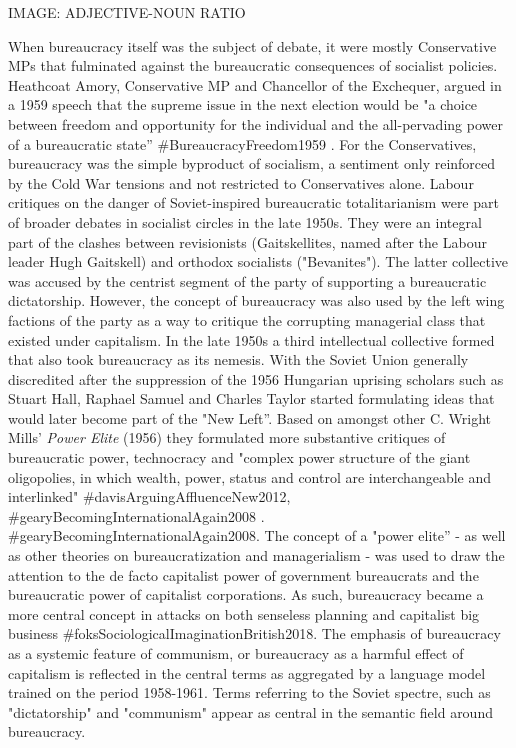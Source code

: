 \documentclass[
]{article}
\begin{document}
IMAGE: ADJECTIVE-NOUN RATIO

When bureaucracy itself was the subject of debate, it were mostly
Conservative MPs that fulminated against the bureaucratic consequences
of socialist policies. Heathcoat Amory, Conservative MP and Chancellor
of the Exchequer, argued in a 1959 speech that the supreme issue in the
next election would be "a choice between freedom and opportunity for the
individual and the all-pervading power of a bureaucratic state''
\#BureaucracyFreedom1959 . For the Conservatives, bureaucracy was the
simple byproduct of socialism, a sentiment only reinforced by the Cold
War tensions and not restricted to Conservatives alone. Labour critiques
on the danger of Soviet-inspired bureaucratic totalitarianism were part
of broader debates in socialist circles in the late 1950s. They were an
integral part of the clashes between revisionists (Gaitskellites, named
after the Labour leader Hugh Gaitskell) and orthodox socialists
("Bevanites"). The latter collective was accused by the centrist segment
of the party of supporting a bureaucratic dictatorship. However, the
concept of bureaucracy was also used by the left wing factions of the
party as a way to critique the corrupting managerial class that existed
under capitalism. In the late 1950s a third intellectual collective
formed that also took bureaucracy as its nemesis. With the Soviet Union
generally discredited after the suppression of the 1956 Hungarian
uprising scholars such as Stuart Hall, Raphael Samuel and Charles Taylor
started formulating ideas that would later become part of the "New
Left''. Based on amongst other C. Wright Mills' \emph{Power Elite}
(1956) they formulated more substantive critiques of bureaucratic power,
technocracy and "complex power structure of the giant oligopolies, in
which wealth, power, status and control are interchangeable and
interlinked" \#davisArguingAffluenceNew2012,
\#gearyBecomingInternationalAgain2008 .
\#gearyBecomingInternationalAgain2008. The concept of a "power elite'' -
as well as other theories on bureaucratization and managerialism - was
used to draw the attention to the de facto capitalist power of
government bureaucrats and the bureaucratic power of capitalist
corporations. As such, bureaucracy became a more central concept in
attacks on both senseless planning and capitalist big business
\#foksSociologicalImaginationBritish2018. The emphasis of bureaucracy as
a systemic feature of communism, or bureaucracy as a harmful effect of
capitalism is reflected in the central terms as aggregated by a language
model trained on the period 1958-1961. Terms referring to the Soviet
spectre, such as "dictatorship" and "communism" appear as central in the
semantic field around bureaucracy.
\end{document}
